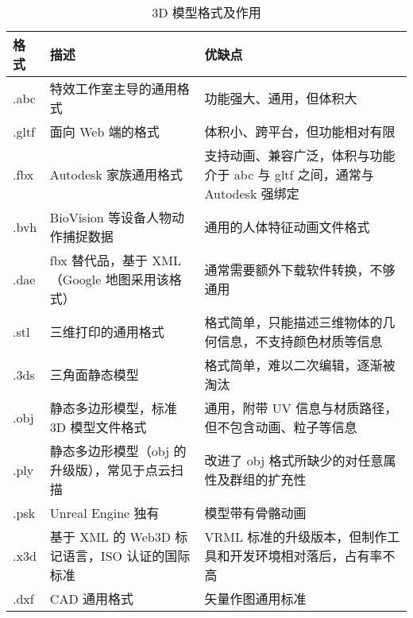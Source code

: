 \begin{table}
  \caption{3D 模型格式及作用}
  \begin{tabularx}{\textwidth}{l|XX}
    \toprule
    格式          & 描述  & 优缺点                 \\
    \midrule
    .abc   & 特效工作室主导的通用格式 & 功能强大、通用，但体积大 \\
    .gltf  & 面向 Web 端的格式 & 体积小、跨平台，但功能相对有限  \\
    .fbx & Autodesk 家族通用格式 & 支持动画、兼容广泛，体积与功能介于 abc 与 gltf 之间，通常与 Autodesk 强绑定   \\
    .bvh & BioVision 等设备人物动作捕捉数据 & 通用的人体特征动画文件格式  \\
    .dae & fbx 替代品，基于 XML（Google 地图采用该格式） & 通常需要额外下载软件转换，不够通用  \\
    .stl & 三维打印的通用格式 & 格式简单，只能描述三维物体的几何信息，不支持颜色材质等信息  \\
    .3ds & 三角面静态模型 & 格式简单，难以二次编辑，逐渐被淘汰  \\
    .obj & 静态多边形模型，标准 3D 模型文件格式 & 通用，附带 UV 信息与材质路径，但不包含动画、粒子等信息  \\
    .ply & 静态多边形模型（obj 的升级版），常见于点云扫描 & 改进了 obj 格式所缺少的对任意属性及群组的扩充性  \\
    .psk & Unreal Engine 独有 & 模型带有骨骼动画  \\
    .x3d & 基于 XML 的 Web3D 标记语言，ISO 认证的国际标准 & VRML 标准的升级版本，但制作工具和开发环境相对落后，占有率不高  \\
    .dxf & CAD 通用格式 & 矢量作图通用标准  \\
    \bottomrule
  \end{tabularx}
  \label{tab:3d-model-format}
\end{table}

